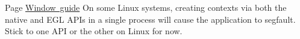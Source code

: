 
\begin{DoxyRefList}
\item[Page \mbox{\hyperlink{window_guide}{Window guide}} ]\label{bug__bug000001}%
%
On some Linux systems, creating contexts via both the native and EGL APIs in a single process will cause the application to segfault. Stick to one API or the other on Linux for now.
\end{DoxyRefList}